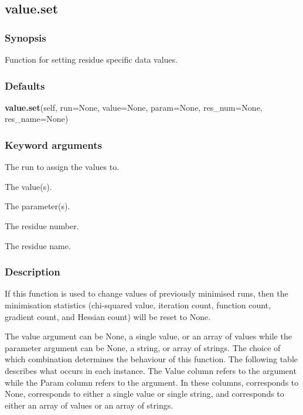   

 \newpage 

 \subsection{value.set} 

  
 \subsubsection{Synopsis} 

 Function for setting residue specific data values. 
  

  
 \subsubsection{Defaults} 

 \textsf{\textbf{value.set}(self, run=None, value=None, param=None, res\_num=None, res\_name=None)} 

  
 \subsubsection{Keyword arguments} 

   The run to assign the values to.   

   The value(s).   

   The parameter(s).   

   The residue number.   

   The residue name.  

  

  
 \subsubsection{Description} 

 If this function is used to change values of previously minimised runs, then the minimisation statistics (chi-squared value, iteration count, function count, gradient count, and Hessian count) will be reset to None. 
  

 The value argument can be None, a single value, or an array of values while the parameter argument can be None, a string, or array of strings.  The choice of which combination determines the behaviour of this function.  The following table describes what occurs in each instance.  The Value column refers to the  argument while the Param column refers to the  argument.  In these columns,  corresponds to None,  corresponds to either a single value or single string, and  corresponds to either an array of values or an array of strings. 
  

